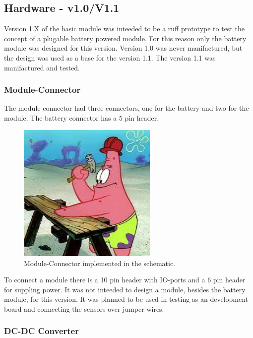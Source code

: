 \subsection{Hardware - v1.0/V1.1}
    Version 1.X of the basic module was inteeded to be a ruff prototype to test the concept of a 
    plugable battery powered module. For this reason only the battery module was designed for this
    version. Version 1.0 was never manifactured, but the design was used as a base for the
    version 1.1. The version 1.1 was manifactured and tested.

    \subsubsection{Module-Connector}
        The module connector had three connectors, one for the battery and two for the
        module. The battery connector has a 5 pin header. 

        \begin{figure}[H]
            \centering
            \includegraphics[width=0.6\textwidth]{assets/HW/TBD2.png}
            \caption{Module-Connector implemented in the schematic.}
        \end{figure}


        To connect a module there is a 10 pin header with IO-ports and a 6 pin header 
        for suppling power. It was not inteeded to design a module, besides the battery module,
        for this version. It was planned to be used in testing as an development board and connecting
        the sensors over jumper wires.

    \subsubsection{DC-DC Converter}
        
